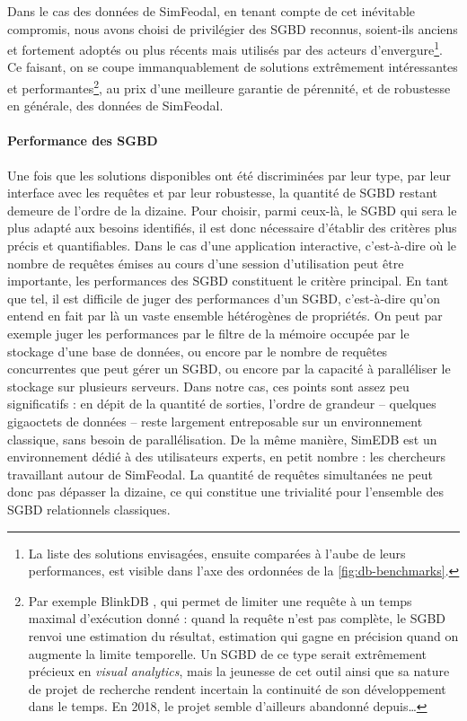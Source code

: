 		Dans le cas des données de SimFeodal, en tenant compte de cet inévitable compromis, nous avons choisi de privilégier des SGBD reconnus, soient-ils anciens et fortement adoptés ou plus récents mais utilisés par des acteurs d'envergure\footnote{
			La liste des solutions envisagées, ensuite comparées à l'aube de leurs performances, est visible dans l'axe des ordonnées de la \cref{fig:db-benchmarks}.
		}.
		Ce faisant, on se coupe immanquablement de solutions extrêmement intéressantes et performantes\footnote{
			Par exemple BlinkDB \autocite{agarwal_blinkdb_2013}, qui permet de limiter une requête à un temps maximal d'exécution donné : quand la requête n'est pas complète, le SGBD renvoi une estimation du résultat, estimation qui gagne en précision quand on augmente la limite temporelle. Un SGBD de ce type serait extrêmement précieux en \textit{visual analytics}, mais la jeunesse de cet outil ainsi que sa nature de projet de recherche rendent incertain la continuité de son développement dans le temps. En 2018, le projet semble d'ailleurs abandonné depuis\ldots
		}, au prix d'une meilleure garantie de pérennité, et de robustesse en générale, des données de SimFeodal.
		
			\paragraph*{Performance des SGBD}
			
			Une fois que les solutions disponibles ont été discriminées par leur type, par leur interface avec les requêtes et par leur robustesse, la quantité de SGBD restant demeure de l'ordre de la dizaine.
			Pour choisir, parmi ceux-là, le SGBD qui sera le plus adapté aux besoins identifiés, il est donc nécessaire d'établir des critères plus précis et quantifiables.
			Dans le cas d'une application interactive, c'est-à-dire où le nombre de requêtes émises au cours d'une session d'utilisation peut être importante, les performances des SGBD constituent le critère principal.
			En tant que tel, il est difficile de juger des \og performances\fg{} d'un SGBD, c'est-à-dire qu'on entend en fait par là un vaste ensemble hétérogènes de propriétés.
			On peut par exemple juger les performances par le filtre de la mémoire occupée par le stockage d'une base de données, ou encore par le nombre de requêtes concurrentes que peut gérer un SGBD, ou encore par la capacité à paralléliser le stockage sur plusieurs serveurs.
			Dans notre cas, ces points sont assez peu significatifs : en dépit de la quantité de sorties, l'ordre de grandeur -- quelques gigaoctets de données -- reste largement entreposable sur un environnement classique, sans besoin de parallélisation.
			De la même manière, SimEDB est un environnement dédié à des utilisateurs experts, en petit nombre : les chercheurs travaillant autour de SimFeodal. La quantité de requêtes simultanées ne peut donc pas dépasser la dizaine, ce qui constitue une trivialité pour l'ensemble des SGBD relationnels classiques.
			
